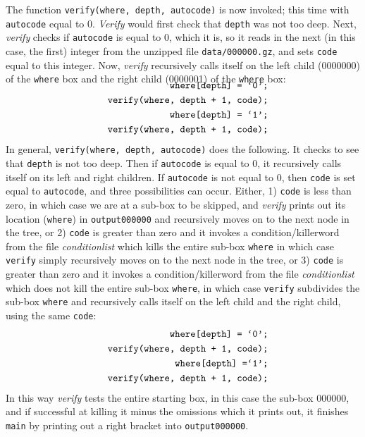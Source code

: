 The function \hbox{\tt verify(where, depth, autocode)} is now invoked; this time with \hbox{\tt autocode} equal to 0.  {\it Verify} would first check that \hbox{\tt depth} was not too deep.  Next, {\it verify} checks if \hbox{\tt autocode} is equal to 0, which it is, so it reads in the next (in this case, the first) integer from the unzipped file \hbox{\tt data/000000.gz}, and sets \hbox{\tt code} equal to this integer.  Now, {\it verify} recursively calls itself on the left child (0000000) of the \hbox{\tt where} box and the right child (0000001) of the
 \hbox{\tt where} box:
\begin{eqnarray*}
\noalign{\vskip-12pt}
&&
\hbox{\tt where[depth] = \hbox{`}0\hbox{'};}
\\
&& \hbox{\tt verify(where, depth + 1, code);}
\\
&&
\hbox{\tt where[depth] = \hbox{`}1\hbox{'};}
\\
&&\hbox{\tt verify(where, depth + 1, code);}
\end{eqnarray*}
In general, \hbox{\tt verify(where, depth, autocode)} does the following.  It checks to see that \hbox{\tt depth} is not too deep.  Then if \hbox{\tt autocode} is equal to 0, it recursively calls itself on its left and right children.  If \hbox{\tt autocode} is not equal to 0, then \hbox{\tt code} is set equal to \hbox{\tt autocode}, and
three possibilities can occur.  Either, 
1)  \hbox{\tt code} is less than zero, in which case we are at 
a sub-box to be skipped, 
 and {\it verify} prints out its location  (\hbox{\tt where}) in \hbox{\tt output000000} and recursively moves on to the next node in the tree, or 
2) \hbox{\tt code} is greater than zero and it invokes a condition/killerword from the file {\it conditionlist} which kills the entire sub-box \hbox{\tt where}
in which case \hbox{\tt verify} simply recursively moves on to the next node in the tree, or 
3) \hbox{\tt code} is greater than zero and it invokes a condition/killerword from the file {\it conditionlist} which does not kill the entire sub-box \hbox{\tt where}, in which case
\hbox{\tt verify} subdivides the sub-box \hbox{\tt where} and recursively calls itself on the left child and the right child, using the same \hbox{\tt code}:
\begin{eqnarray*}
&&\hbox{\tt where[depth] = \hbox{`}0\hbox{'};}
\\ &&\hbox{\tt verify(where, depth + 1, code);}
\\ &&\hbox{\tt where[depth] =\hbox{`}1\hbox{'};}
\\ &&\hbox{\tt verify(where, depth + 1, code);}
\end{eqnarray*}
In this way {\it verify} tests the entire starting box, in this case the sub-box 000000, and if successful at killing
it minus the omissions which it prints out, it finishes \hbox{\tt main} by printing out a right bracket into \hbox{\tt output000000}. 
  
